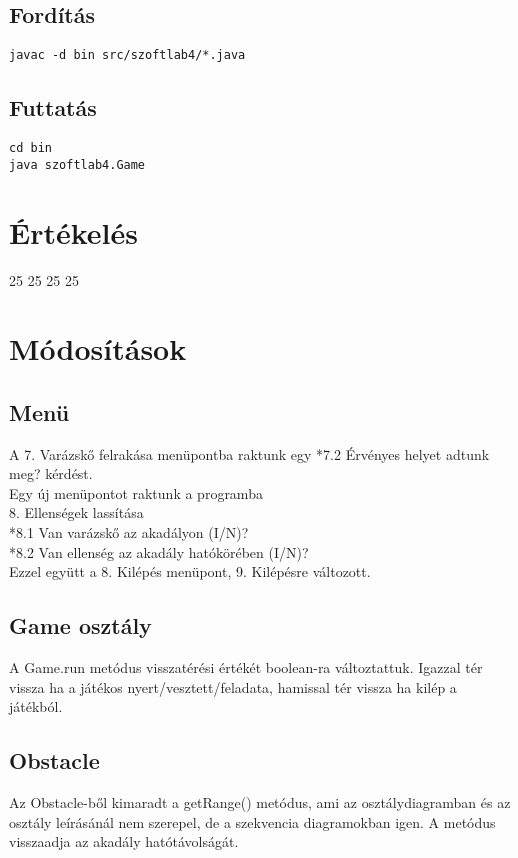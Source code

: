 \subsection{Fordítás}

\lstset{escapeinside=`', xleftmargin=10pt, frame=single, basicstyle=\ttfamily\footnotesize, language=sh}
\begin{lstlisting}
javac -d bin src/szoftlab4/*.java
\end{lstlisting}

\subsection{Futtatás}

\lstset{escapeinside=`', xleftmargin=10pt, frame=single, basicstyle=\ttfamily\footnotesize, language=sh}
\begin{lstlisting}
cd bin
java szoftlab4.Game
\end{lstlisting}

\section{Értékelés}

\begin{ertekeles}
{25}        %
{25}
{25}
{25}
\end{ertekeles}

\section{Módosítások}
\subsection{Menü}
A 7. Varázskő felrakása menüpontba raktunk egy *7.2 Érvényes helyet adtunk meg? kérdést. \\
Egy új menüpontot raktunk a programba \\
8. Ellenségek lassítása \\
*8.1 Van varázskő az akadályon (I/N)? \\
*8.2 Van ellenség az akadály hatókörében (I/N)? \\
Ezzel együtt a 8. Kilépés menüpont, 9. Kilépésre változott. \\

\subsection{Game osztály}
A Game.run metódus visszatérési értékét boolean-ra változtattuk. Igazzal tér vissza ha a játékos nyert/vesztett/feladata, hamissal tér vissza ha kilép a játékból.

\subsection{Obstacle}
Az Obstacle-ből kimaradt a getRange() metódus, ami az osztálydiagramban és az osztály leírásánál nem szerepel, de a szekvencia diagramokban igen. A metódus visszaadja az akadály hatótávolságát.
